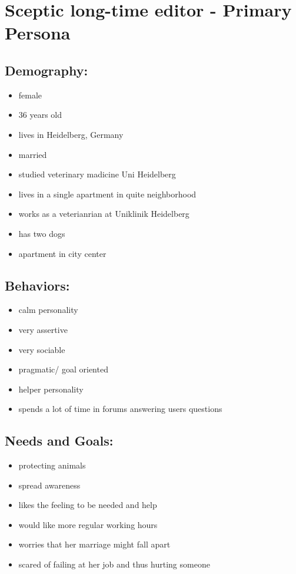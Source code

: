 \documentclass{article}
\date{11.11.2015}
\begin{document}
\section{Sceptic long-time editor - Primary Persona}

\subsection{Demography:}
\begin{itemize}
 \item female
 \item 36 years old
 \item lives in Heidelberg, Germany
 \item married
 \item studied veterinary madicine Uni Heidelberg
 \item lives in a single apartment in quite neighborhood
 \item works as a veterianrian at Uniklinik Heidelberg
 \item has two dogs
 \item apartment in city center
\end{itemize}

\subsection{Behaviors:}
\begin{itemize}
\item calm personality
\item very assertive
\item very sociable
\item pragmatic/ goal oriented
\item helper personality
\item spends a lot of time in forums answering users questions
\end{itemize}

\subsection{Needs and Goals:}
\begin{itemize}
 \item protecting animals
 \item spread awareness
 \item likes the feeling to be needed and help
 \item would like more regular working hours
 \item worries that her marriage might fall apart
 \item scared of failing at her job and thus hurting someone
\end{itemize}
\end{document}

